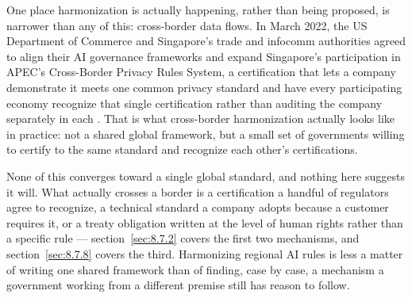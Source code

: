 One place harmonization is actually happening, rather than being proposed, is narrower than any of this: cross-border data flows. In March 2022, the US Department of Commerce and Singapore's trade and infocomm authorities agreed to align their AI governance frameworks and expand Singapore's participation in APEC's Cross-Border Privacy Rules System, a certification that lets a company demonstrate it meets one common privacy standard and have every participating economy recognize that single certification rather than auditing the company separately in each \autocite{commerce2022singapore}. That is what cross-border harmonization actually looks like in practice: not a shared global framework, but a small set of governments willing to certify to the same standard and recognize each other's certifications.

None of this converges toward a single global standard, and nothing here suggests it will. What actually crosses a border is a certification a handful of regulators agree to recognize, a technical standard a company adopts because a customer requires it, or a treaty obligation written at the level of human rights rather than a specific rule — section~\ref{sec:8.7.2} covers the first two mechanisms, and section~\ref{sec:8.7.8} covers the third. Harmonizing regional AI rules is less a matter of writing one shared framework than of finding, case by case, a mechanism a government working from a different premise still has reason to follow.
